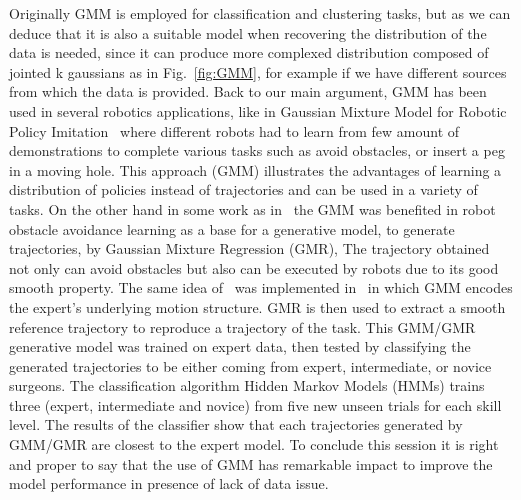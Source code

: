 \vspace{10pt} 
Originally GMM is employed for classification and clustering tasks, but as we can deduce that it is also a suitable model when recovering the distribution of the data is needed, since it can produce more complexed distribution composed of jointed k gaussians as in Fig.~\ref{fig:GMM}, for example if we have different sources from which the data is provided. Back to our main argument, GMM has been used in several robotics applications, like in Gaussian Mixture Model for Robotic Policy Imitation~\cite{pignat2019bayesian} where different robots had to learn from few amount of demonstrations to complete various tasks such as avoid obstacles, or insert a peg in a moving hole. This approach (GMM) illustrates the advantages of learning a distribution of policies instead of trajectories and can be used in a variety of tasks. On the other hand in some work as in~\cite{zhang2016robot} the GMM was benefited in robot obstacle avoidance learning as a base for a generative model, to generate trajectories, by Gaussian Mixture Regression (GMR), The trajectory obtained not only can avoid obstacles but also can be executed by robots due to its good smooth property. The same idea of~\cite{zhang2016robot} was implemented in~\cite{reiley2010motion} in which GMM encodes the expert’s underlying motion structure. GMR is then used to extract a smooth reference trajectory to reproduce a trajectory of the task. This GMM/GMR generative model was trained on expert data, then tested by classifying the generated trajectories  to be either coming from expert, intermediate, or novice surgeons. The classification algorithm Hidden Markov Models (HMMs) trains three (expert, intermediate and novice) from five new unseen trials for each skill level. The results of the classifier show that each trajectories generated by GMM/GMR are closest to the expert model. To conclude this session it is right and proper to say that the use of GMM has remarkable impact to improve the model performance in presence of lack of data issue.


